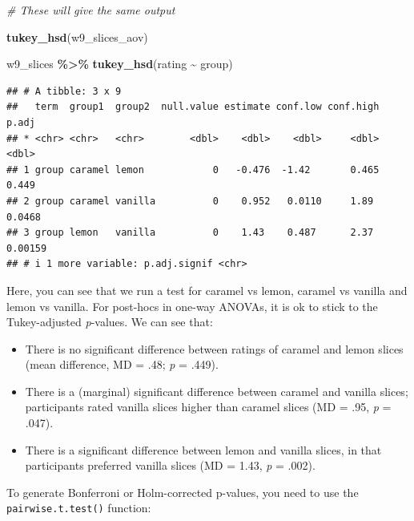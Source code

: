 \documentclass[
]{book}
\newenvironment{Shaded}{\begin{snugshade}}{\end{snugshade}}
\newcommand{\AttributeTok}[1]{\textcolor[rgb]{0.13,0.29,0.53}{#1}}
\newcommand{\CommentTok}[1]{\textcolor[rgb]{0.56,0.35,0.01}{\textit{#1}}}
\newcommand{\FunctionTok}[1]{\textcolor[rgb]{0.13,0.29,0.53}{\textbf{#1}}}
\newcommand{\NormalTok}[1]{#1}
\newcommand{\SpecialCharTok}[1]{\textcolor[rgb]{0.81,0.36,0.00}{\textbf{#1}}}
\newcommand{\StringTok}[1]{\textcolor[rgb]{0.31,0.60,0.02}{#1}}
\providecommand{\tightlist}{%
  \setlength{\itemsep}{0pt}\setlength{\parskip}{0pt}}
\begin{document}
\begin{Shaded}
\begin{Highlighting}[]
\CommentTok{\# These will give the same output}

\FunctionTok{tukey\_hsd}\NormalTok{(w9\_slices\_aov)}

\NormalTok{w9\_slices }\SpecialCharTok{\%\textgreater{}\%}
  \FunctionTok{tukey\_hsd}\NormalTok{(rating }\SpecialCharTok{\textasciitilde{}}\NormalTok{ group)}
\end{Highlighting}
\end{Shaded}

\begin{verbatim}
## # A tibble: 3 x 9
##   term  group1  group2  null.value estimate conf.low conf.high   p.adj
## * <chr> <chr>   <chr>        <dbl>    <dbl>    <dbl>     <dbl>   <dbl>
## 1 group caramel lemon            0   -0.476  -1.42       0.465 0.449  
## 2 group caramel vanilla          0    0.952   0.0110     1.89  0.0468 
## 3 group lemon   vanilla          0    1.43    0.487      2.37  0.00159
## # i 1 more variable: p.adj.signif <chr>
\end{verbatim}

Here, you can see that we run a test for caramel vs lemon, caramel vs vanilla and lemon vs vanilla. For post-hocs in one-way ANOVAs, it is ok to stick to the Tukey-adjusted \emph{p}-values. We can see that:

\begin{itemize}
\tightlist
\item
  There is no significant difference between ratings of caramel and lemon slices (mean difference, MD = .48; \emph{p} = .449).
\item
  There is a (marginal) significant difference between caramel and vanilla slices; participants rated vanilla slices higher than caramel slices (MD = .95, \emph{p} = .047).
\item
  There is a significant difference between lemon and vanilla slices, in that participants preferred vanilla slices (MD = 1.43, \emph{p} = .002).
\end{itemize}

To generate Bonferroni or Holm-corrected p-values, you need to use the \texttt{pairwise.t.test()} function:

\begin{Shaded}
\end{Shaded}
\end{document}
